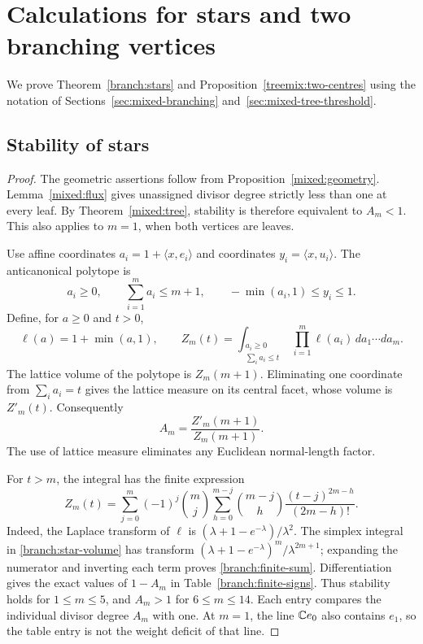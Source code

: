 \section{Calculations for stars and two branching vertices}\label{sec:blowup-comparisons}

We prove Theorem~\ref{branch:stars} and
Proposition~\ref{treemix:two-centres} using the notation of
Sections~\ref{sec:mixed-branching} and~\ref{sec:mixed-tree-threshold}.

\subsection{Stability of stars}
\begin{proof}
The geometric assertions follow from Proposition~\ref{mixed:geometry}.
Lemma~\ref{mixed:flux} gives unassigned divisor degree strictly less
than one at every leaf. By Theorem~\ref{mixed:tree}, stability is
therefore equivalent to $A_m<1$. This also applies to $m=1$, when
both vertices are leaves.

Use affine coordinates $a_i=1+\langle x,e_i\rangle$ and coordinates
$y_i=\langle x,u_i\rangle$. The anticanonical polytope is
\[
 a_i\ge0,\qquad \sum_{i=1}^m a_i\le m+1,\qquad
 -\min(a_i,1)\le y_i\le1.
\]
Define, for $a\ge0$ and $t>0$,
\begin{equation}\label{branch:star-volume}
 \ell(a)=1+\min(a,1),\qquad
 Z_m(t)=
 \int_{\substack{a_i\ge0\\\sum_i a_i\le t}}
       \prod_{i=1}^m\ell(a_i)\,da_1\cdots da_m.
\end{equation}
The lattice volume of the polytope is $Z_m(m+1)$. Eliminating one
coordinate from $\sum_i a_i=t$ gives the lattice measure on its central
facet, whose volume is $Z'_m(t)$. Consequently
\begin{equation}\label{branch:central-degree}
 A_m=\frac{Z'_m(m+1)}{Z_m(m+1)}.
\end{equation}
The use of lattice measure eliminates any Euclidean normal-length
factor.

For $t>m$, the integral has the finite expression
\begin{equation}\label{branch:finite-sum}
 Z_m(t)=
 \sum_{j=0}^{m}(-1)^j\binom mj
 \sum_{h=0}^{m-j}\binom{m-j}{h}
 \frac{(t-j)^{2m-h}}{(2m-h)!}.
\end{equation}
Indeed, the Laplace transform of $\ell$ is
$(\lambda+1-e^{-\lambda})/\lambda^2$. The simplex integral in
\eqref{branch:star-volume} has transform
$(\lambda+1-e^{-\lambda})^m/\lambda^{2m+1}$; expanding the numerator
and inverting each term proves \eqref{branch:finite-sum}.
Differentiation gives the exact values of $1-A_m$ in
Table~\ref{branch:finite-signs}. Thus stability holds for $1\le m\le5$,
and $A_m>1$ for $6\le m\le14$. Each entry compares the individual
divisor degree $A_m$ with one. At $m=1$, the line $\mathbb{C} e_0$ also
contains $e_1$, so the table entry is not the weight deficit of that
line.


\end{proof}
